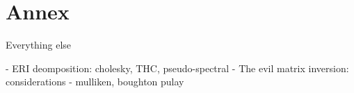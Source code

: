 \chapter{Annex}

Everything else

- ERI deomposition: cholesky, THC, pseudo-spectral
- The evil matrix inversion: considerations
- mulliken, boughton pulay